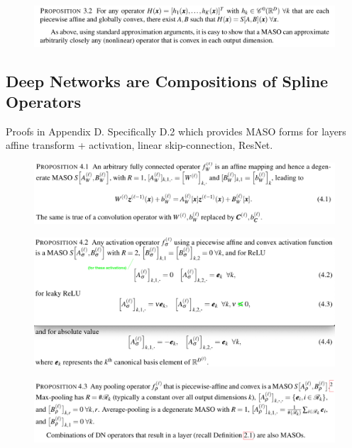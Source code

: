 \documentclass{article}
\begin{document}
\begin{figure}[h]
	\begin{center}
		\includegraphics[width=.8\linewidth]{Figure/prop3p2}
		\label{fig:prop3p2}
	\end{center}
\end{figure}


\subsection{Deep Networks are Compositions of Spline Operators}

Proofs in Appendix D. Specifically D.2 which provides MASO forms for layers affine transform + activation, linear skip-connection, ResNet.

\begin{figure}[h]
	\begin{center}
		\includegraphics[width=.8\linewidth]{Figure/prop4p1}
		\label{fig:prop4p1}
	\end{center}
\end{figure}

\begin{figure}[h]
	\begin{center}
		\includegraphics[width=.8\linewidth]{Figure/prop4p2}
		\label{fig:prop4p2}
	\end{center}
\end{figure}


\begin{figure}[h]
	\begin{center}
		\includegraphics[width=.8\linewidth]{Figure/prop4p3}
		\label{fig:prop4p3}
	\end{center}
\end{figure}
\end{document}
